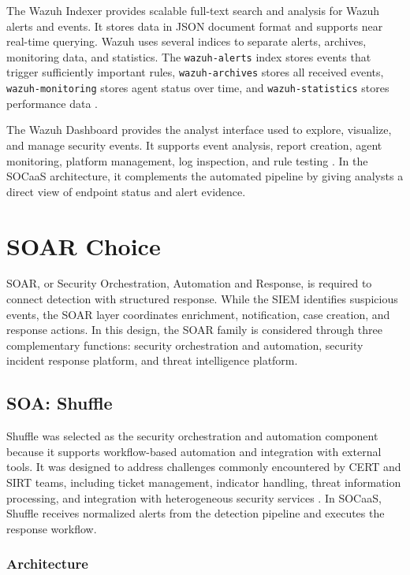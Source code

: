 The Wazuh Indexer provides scalable full-text search and analysis for Wazuh alerts and events. It stores data in JSON document format and supports near real-time querying. Wazuh uses several indices to separate alerts, archives, monitoring data, and statistics. The \texttt{wazuh-alerts} index stores events that trigger sufficiently important rules, \texttt{wazuh-archives} stores all received events, \texttt{wazuh-monitoring} stores agent status over time, and \texttt{wazuh-statistics} stores performance data \cite{wazuh-indexer}.

The Wazuh Dashboard provides the analyst interface used to explore, visualize, and manage security events. It supports event analysis, report creation, agent monitoring, platform management, log inspection, and rule testing \cite{wazuh-dashboard}. In the SOCaaS architecture, it complements the automated pipeline by giving analysts a direct view of endpoint status and alert evidence.

\section{SOAR Choice}
\label{sec:soar}

SOAR, or Security Orchestration, Automation and Response, is required to connect detection with structured response. While the SIEM identifies suspicious events, the SOAR layer coordinates enrichment, notification, case creation, and response actions. In this design, the SOAR family is considered through three complementary functions: security orchestration and automation, security incident response platform, and threat intelligence platform.

\subsection{SOA: Shuffle}
\label{subsec:shuffle}

Shuffle was selected as the security orchestration and automation component because it supports workflow-based automation and integration with external tools. It was designed to address challenges commonly encountered by CERT and SIRT teams, including ticket management, indicator handling, threat information processing, and integration with heterogeneous security services \cite{shuffle-docs}. In SOCaaS, Shuffle receives normalized alerts from the detection pipeline and executes the response workflow.

\subsubsection{Architecture}
\label{subsubsec:shuffle-arch}

